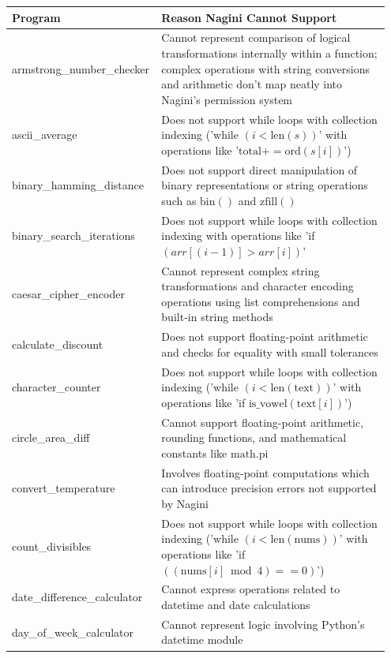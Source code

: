 \documentclass[8pt]{extarticle}
\begin{document}
\begin{table}[H]
\centering
\begin{tabular}{|p{0.35\linewidth}|p{0.6\linewidth}|}
\hline
\textbf{Program} & \textbf{Reason Nagini Cannot Support} \\
\hline
armstrong\_number\_checker & Cannot represent comparison of logical transformations internally within a function; complex operations with string conversions and arithmetic don't map neatly into Nagini's permission system \\
\hline
ascii\_average & Does not support while loops with collection indexing ('while $(i < \text{len}(s))$' with operations like '$\text{total} += \text{ord}(s[i])$') \\
\hline
binary\_hamming\_distance & Does not support direct manipulation of binary representations or string operations such as $\text{bin}()$ and $\text{zfill}()$ \\
\hline
binary\_search\_iterations & Does not support while loops with collection indexing with operations like 'if $(arr[(i - 1)] > arr[i])$' \\
\hline
caesar\_cipher\_encoder & Cannot represent complex string transformations and character encoding operations using list comprehensions and built-in string methods \\
\hline
calculate\_discount & Does not support floating-point arithmetic and checks for equality with small tolerances \\
\hline
character\_counter & Does not support while loops with collection indexing ('while $(i < \text{len}(\text{text}))$' with operations like 'if $\text{is\_vowel}(\text{text}[i])$') \\
\hline
circle\_area\_diff & Cannot support floating-point arithmetic, rounding functions, and mathematical constants like $\text{math.pi}$ \\
\hline
convert\_temperature & Involves floating-point computations which can introduce precision errors not supported by Nagini \\
\hline
count\_divisibles & Does not support while loops with collection indexing ('while $(i < \text{len}(\text{nums}))$' with operations like 'if $((\text{nums}[i] \bmod 4) == 0)$') \\
\hline
date\_difference\_calculator & Cannot express operations related to datetime and date calculations \\
\hline
day\_of\_week\_calculator & Cannot represent logic involving Python's datetime module \\

\end{tabular}
\end{table}
\end{document}

